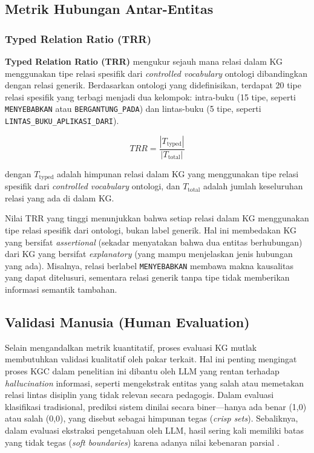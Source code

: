 \documentclass[main]{subfiles}
\begin{document}
\subsection{Metrik Hubungan Antar-Entitas}
\label{subsec:metrik-hubungan}

\subsubsection{Typed Relation Ratio (TRR)}

\textbf{Typed Relation Ratio (TRR)} mengukur sejauh mana relasi dalam KG
menggunakan tipe relasi spesifik dari \textit{controlled vocabulary}
ontologi dibandingkan dengan relasi generik. Berdasarkan ontologi yang
didefinisikan, terdapat 20 tipe relasi spesifik yang terbagi menjadi dua
kelompok: intra-buku (15 tipe, seperti \texttt{MENYEBABKAN} atau
\texttt{BERGANTUNG\_PADA}) dan lintas-buku (5 tipe, seperti
\texttt{LINTAS\_BUKU\_APLIKASI\_DARI}).

\[
  TRR = \frac{|T_{\text{typed}}|}{|T_{\text{total}}|}
\]

\noindent dengan $T_{\text{typed}}$ adalah himpunan relasi dalam KG yang
menggunakan tipe relasi spesifik dari \textit{controlled vocabulary}
ontologi, dan $T_{\text{total}}$ adalah jumlah keseluruhan relasi yang
ada di dalam KG.

Nilai TRR yang tinggi menunjukkan bahwa setiap relasi dalam KG
menggunakan tipe relasi spesifik dari ontologi, bukan label generik. Hal
ini membedakan KG yang bersifat \textit{assertional} (sekadar menyatakan
bahwa dua entitas berhubungan) dari KG yang bersifat \textit{explanatory}
(yang mampu menjelaskan jenis hubungan yang ada). Misalnya, relasi
berlabel \texttt{MENYEBABKAN} membawa makna kausalitas yang dapat
ditelusuri, sementara relasi generik tanpa tipe tidak memberikan informasi
semantik tambahan.

\subsection{Validasi Manusia (Human Evaluation)}
\label{subsec:validasi-manusia}

Selain mengandalkan metrik kuantitatif, proses evaluasi KG mutlak
membutuhkan validasi kualitatif oleh pakar terkait. Hal ini penting
mengingat proses KGC dalam penelitian ini dibantu oleh LLM yang rentan
terhadap \textit{hallucination} informasi, seperti mengekstrak entitas yang salah
atau memetakan relasi lintas disiplin yang tidak relevan secara
pedagogis. Dalam evaluasi klasifikasi tradisional, prediksi sistem
dinilai secara biner---hanya ada benar (1,0) atau salah (0,0), yang
disebut sebagai himpunan tegas (\textit{crisp sets}). Sebaliknya, dalam
evaluasi ekstraksi pengetahuan oleh LLM, hasil sering kali memiliki
batas yang tidak tegas (\textit{soft boundaries}) karena adanya nilai
kebenaran parsial \parencite{harju_evaluating_2023}.
\end{document}
